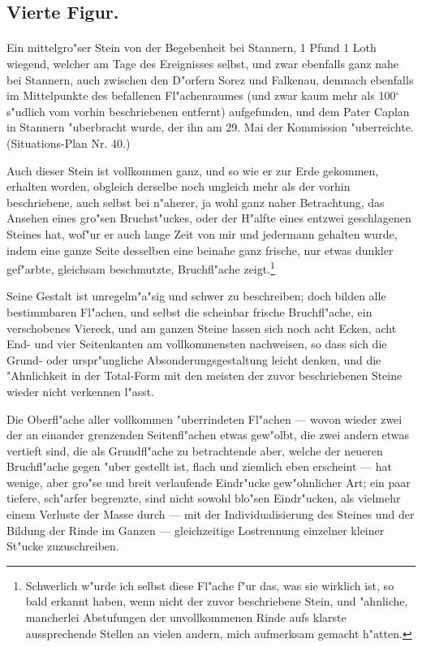 \documentclass[a4paper, 11pt, oneside, german]{article}
\begin{document}
\subsection{Vierte Figur.}
\paragraph{}
Ein mittelgro"ser Stein von der Begebenheit bei Stannern, 1 Pfund 1 Loth wiegend, welcher am Tage des Ereignisses selbst, und zwar ebenfalls ganz nahe bei Stannern, auch zwischen den D"orfern Sorez und Falkenau, demnach ebenfalls im Mittelpunkte des befallenen Fl"achenraumes (und zwar kaum mehr als 100$^{\circ}$ s"udlich vom vorhin beschriebenen entfernt) aufgefunden, und dem Pater Caplan in Stannern "uberbracht wurde, der ihn am 29. Mai der Kommission "uberreichte. (Situations-Plan Nr. 40.)

Auch dieser Stein ist vollkommen ganz, und so wie er zur Erde gekommen, erhalten worden, obgleich derselbe noch ungleich mehr als der vorhin beschriebene, auch selbst bei n"aherer, ja wohl ganz naher Betrachtung, das Ansehen eines gro"sen Bruchst"uckes, oder der H"alfte eines entzwei geschlagenen Steines hat, wof"ur er auch lange Zeit von mir und jedermann gehalten wurde, indem eine ganze Seite desselben eine beinahe ganz frische, nur etwas dunkler gef"arbte, gleichsam beschmutzte, Bruchfl"ache zeigt.\footnote{Schwerlich w"urde ich selbst diese Fl"ache f"ur das, was sie wirklich ist, so bald erkannt haben, wenn nicht der zuvor beschriebene Stein, und "ahnliche, mancherlei Abstufungen der unvollkommenen Rinde aufs klarste aussprechende Stellen an vielen andern, mich aufmerksam gemacht h"atten.}

Seine Gestalt ist unregelm"a"sig und schwer zu beschreiben; doch bilden alle bestimmbaren Fl"achen, und selbst die scheinbar frische Bruchfl"ache, ein verschobenes Viereck, und am ganzen Steine lassen sich noch acht Ecken, acht End- und vier Seitenkanten am vollkommensten nachweisen, so dass sich die Grund- oder urspr"ungliche Absonderungsgestaltung leicht denken, und die "Ahnlichkeit in der Total-Form mit den meisten der zuvor beschriebenen Steine wieder nicht verkennen l"asst.

Die Oberfl"ache aller vollkommen "uberrindeten Fl"achen --- wovon wieder zwei der an einander grenzenden Seitenfl"achen etwas gew"olbt, die zwei andern etwas vertieft sind, die als Grundfl"ache zu betrachtende aber, welche der neueren Bruchfl"ache gegen "uber gestellt ist, flach und ziemlich eben erscheint --- hat wenige, aber gro"se und breit verlaufende Eindr"ucke gew"ohnlicher Art; ein paar tiefere, sch"arfer begrenzte, sind nicht sowohl blo"sen Eindr"ucken, als vielmehr einem Verluste der Masse durch --- mit der Individualisierung des Steines und der Bildung der Rinde im Ganzen --- gleichzeitige Lostrennung einzelner kleiner St"ucke zuzuschreiben.
\end{document}
